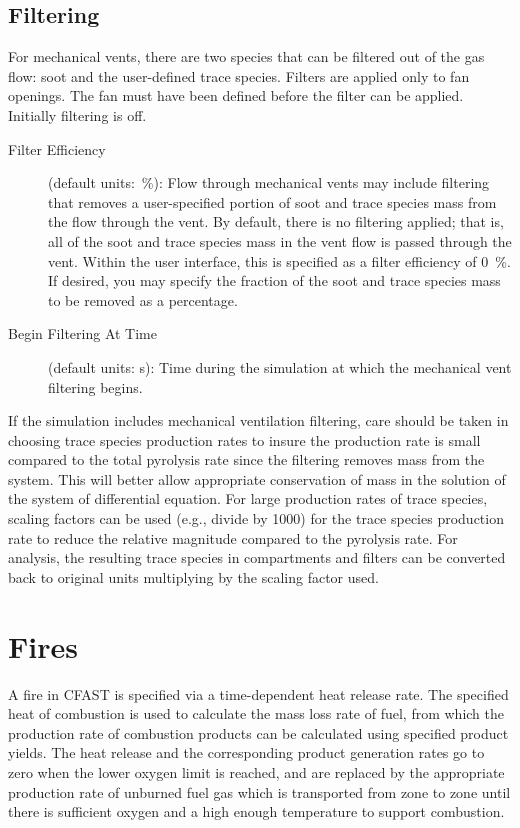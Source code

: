 \section{Filtering}

For mechanical vents, there are two species that can be filtered out of the gas flow: soot and the user-defined trace species. Filters are applied only to fan openings. The fan must have been defined before the filter can be applied. Initially filtering is off.
\begin{description}
\item[Filter Efficiency] (default units:~\%): Flow through mechanical vents may include filtering that removes a user-specified portion of soot and trace species mass from the flow through the vent.  By default, there is no filtering applied; that is, all of the soot and trace species mass in the vent flow is passed through the vent. Within the user interface, this is specified as a filter efficiency of 0~\%.  If desired, you may specify the fraction of the soot and trace species mass to be removed as a percentage.
\item[Begin Filtering At Time] (default units: s): Time during the simulation at which the mechanical vent filtering begins.
\end{description}
If the simulation includes mechanical ventilation filtering, care should be taken in choosing trace species production rates to insure the production rate is small compared to the total pyrolysis rate since the filtering removes mass from the system.  This will better allow appropriate conservation of mass in the solution of the system of differential equation.  For large production rates of trace species, scaling factors can be used (e.g., divide by 1000) for the trace species production rate to reduce the relative magnitude compared to the pyrolysis rate.  For analysis, the resulting trace species in compartments and filters can be converted back to original units multiplying by the scaling factor used.






\chapter{Fires}

A fire in CFAST is specified via a time-dependent heat release rate. The specified heat of combustion is used to calculate the mass loss rate of fuel, from which the production rate of combustion products can be calculated using specified product yields. The heat release and the corresponding product generation rates go to zero when the lower oxygen limit is reached, and are replaced by the appropriate production rate of unburned fuel gas which is transported from zone to zone until there is sufficient oxygen and a high enough temperature to support combustion.

